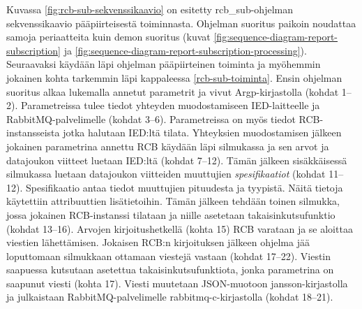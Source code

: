 Kuvassa \ref{fig:rcb-sub-sekvenssikaavio} on esitetty rcb\_sub-ohjelman sekvenssikaavio pääpiirteisestä toiminnasta. Ohjelman suoritus paikoin noudattaa samoja periaatteita kuin demon suoritus (kuvat \ref{fig:sequence-diagram-report-subscription} ja \ref{fig:sequence-diagram-report-subscription-processing}). Seuraavaksi käydään läpi ohjelman pääpiirteinen toiminta ja myöhemmin jokainen kohta tarkemmin läpi kappaleessa \ref{rcb-sub-toiminta}. Ensin ohjelman suoritus alkaa lukemalla annetut parametrit ja vivut Argp-kirjastolla (kohdat 1--2). Parametreissa tulee tiedot yhteyden muodostamiseen IED-laitteelle ja RabbitMQ-palvelimelle (kohdat 3--6). Parametreissa on myös tiedot RCB-instansseista jotka halutaan IED:ltä tilata. Yhteyksien muodostamisen jälkeen jokainen parametrina annettu RCB käydään läpi silmukassa ja sen arvot ja datajoukon viitteet luetaan IED:ltä (kohdat 7--12). Tämän jälkeen sisäkkäisessä silmukassa luetaan datajoukon viitteiden muuttujien \emph{spesifikaatiot} (kohdat 11--12). Spesifikaatio antaa tiedot muuttujien pituudesta ja tyypistä. Näitä tietoja käytettiin attribuuttien lisätietoihin. Tämän jälkeen tehdään toinen silmukka, jossa jokainen RCB-instanssi tilataan ja niille asetetaan takaisinkutsufunktio (kohdat 13--16). Arvojen kirjoitushetkellä (kohta 15) RCB varataan ja se aloittaa viestien lähettämisen. Jokaisen RCB:n kirjoituksen jälkeen ohjelma jää loputtomaan silmukkaan ottamaan viestejä vastaan (kohdat 17--22). Viestin saapuessa kutsutaan asetettua takaisinkutsufunktiota, jonka parametrina on saapunut viesti (kohta 17). Viesti muutetaan JSON-muotoon jansson-kirjastolla ja julkaistaan RabbitMQ-palvelimelle rabbitmq-c-kirjastolla (kohdat 18--21).

